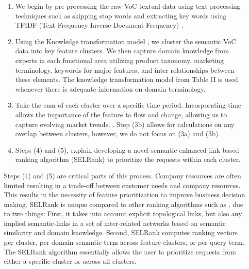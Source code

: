\documentclass[sigconf]{acmart}
\begin{document}
\begin{enumerate}
  \item We begin by pre-processing the raw VoC textual data \cite{Rajagopalan:2001:EDP:2220403.2220656} using text processing techniques such as skipping stop words and extracting key words using TFIDF (Text Frequency Inverse Document Frequency) \cite{Salton:1988:TAA:54259.54260}.
   \item Using the Knowledge transformation model
   , we cluster the semantic VoC data into key feature clusters. We then capture domain knowledge from experts in each functional area utilizing product taxonomy, marketing terminology, keywords for major features, and inter-relationships between these elements. The knowledge transformation model from Table II is used whenever there is adequate information on domain terminology.
   \item Take the sum of each cluster over a specific time period. Incorporating time allows the importance of the feature to flow and change, allowing us to capture evolving market trends. \cite{Last:2001:KDT:2225286.2225838} \cite{Zhang:2004:DGN:2220415.2220823}. Step (3b) allows for calculations on any overlap between clusters, however, we do not focus on (3a) and (3b). 
   \item Steps (4) and (5), explain developing a novel semantic enhanced link-based ranking algorithm (SELRank) to prioritize the requests within each cluster. 
\end{enumerate} 

Steps (4) and (5) are critical parts of this process. Company resources are often limited resulting in a trade-off between customer needs and company resources. This results in the necessity of feature prioritization to improve business decision making. SELRank is unique compared to other ranking algorithms such as \cite{Haveliwala:2002:TP:511446.511513} \cite{Kleinberg:1999:ASH:324133.324140} \cite{Wu:2005:ULM:1068511.1069402} \cite{Xue:2005:EHS:1076034.1076068} 
\cite{Zhou:2007:CAD:1441428.1442053}, due to two things: First, it takes into account explicit topological links, but also any implied semantic-links in a set of inter-related networks based on semantic similarity and domain knowledge. Second, SELRank computes ranking vectors per cluster, per domain semantic term across feature clusters, or per query term. The SELRank algorithm essentially allows the user to prioritize requests from either a specific cluster or across all clusters.   
\end{document}
